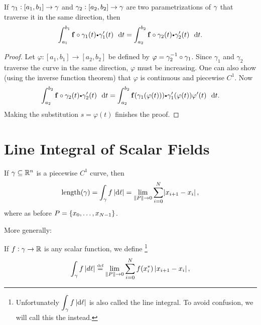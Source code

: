   \begin{proposition}
    If $\gamma_1:[a_1, b_1] \to \gamma$ and $\gamma_2:[a_2, b_2] \to \gamma$ are two parametrizations of $\gamma$ that traverse it in the same direction, then
    \begin{equation*}
      \dint_{a_1}^{b_1} \funvect{f} \circ \gamma_1(t) \bp \gamma_1'(t) \, \dt
      =
      \dint_{a_2}^{b_2} \funvect{f} \circ \gamma_2(t) \bp \gamma_2'(t) \, \dt.
    \end{equation*}
  \end{proposition}
  \begin{proof}
    Let $\varphi:[a_1, b_1] \to [a_2, b_2]$ be defined by $\varphi = \gamma_2^{-1} \circ \gamma_1$.
    Since $\gamma_1$ and $\gamma_2$ traverse the curve in the same direction, $\varphi$ must be increasing.
    One can also show (using the inverse function theorem) that  $\varphi$ is continuous and piecewise $C^1$.
    Now
    \begin{equation*}
      \dint_{a_2}^{b_2} \funvect{f} \circ \gamma_2(t) \bp \gamma_2'(t) \, \dt
	= \dint_{a_2}^{b_2} \funvect{f}( \gamma_1( \varphi(t) ) ) \bp \gamma_1'( \varphi(t) ) \varphi'(t) \, \dt.
    \end{equation*}
    Making the substitution $s = \varphi(t)$ finishes the proof.
  \end{proof}

  \section{Line Integral of Scalar Fields}
  
  \begin{definition}
    If $\gamma \subseteq \mathbb{R}^n$ is a piecewise $C^1$ curve, then
    \begin{equation*}
      \arclen(\caminho) =\dint_\caminho f \, \abs{\dif \ell}= \lim_{\norm{P} \to 0} \sum_{i = 0}^N \abs{x_{i+1} - x_i},
    \end{equation*}
    where as before $P = \set{x_0, \dots, x_{N-1}}$.
    \end{definition}
  
    
    More generally:
 \begin{definition}   
    If $f: \gamma \to \mathbb{R}$ is any scalar function, we define%
    \footnote{Unfortunately $\dint_\caminho f \, \abs{\dif \ell}$ is also called the line integral. To avoid confusion, we will call this the   instead.}
    \begin{equation*}
      \displaystyle\int_\gamma f \, \abs{d \ell}
	\stackrel{\scriptscriptstyle\text{def}}{=} \lim_{{\left\|P\right\|} \to 0} \sum_{i = 0}^N f(x_i^*) \, \abs{x_{i+1} - x_i},
    \end{equation*}
  \end{definition}
  

